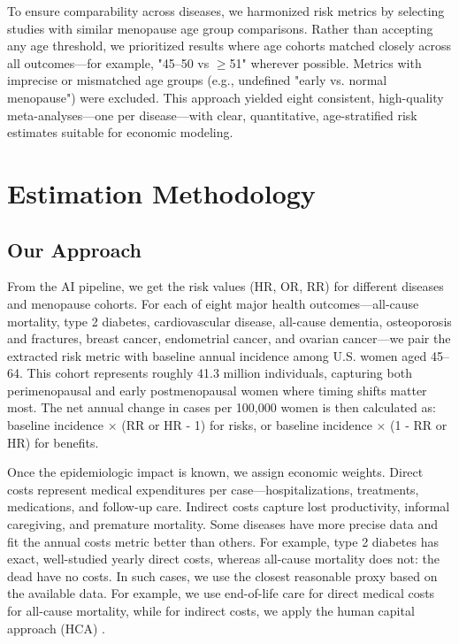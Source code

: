 \documentclass[12pt]{article}
\begin{document}
To ensure comparability across diseases, we harmonized risk metrics by selecting studies with similar menopause age group comparisons. Rather than accepting any age threshold, we prioritized results where age cohorts matched closely across all outcomes—for example, "45–50 vs $\geq$51" wherever possible. Metrics with imprecise or mismatched age groups (e.g., undefined "early vs. normal menopause") were excluded. This approach yielded eight consistent, high-quality meta-analyses—one per disease—with clear, quantitative, age-stratified risk estimates suitable for economic modeling.

\newpage
\section{Estimation Methodology}
\subsection{Our Approach}
From the AI pipeline, we get the risk values (HR, OR, RR) for different diseases and menopause cohorts. For each of eight major health outcomes---all-cause mortality, type 2 diabetes, cardiovascular disease, all-cause dementia, osteoporosis and fractures, breast cancer, endometrial cancer, and ovarian cancer---we pair the extracted risk metric with baseline annual incidence among U.S. women aged 45--64. This cohort represents roughly 41.3 million individuals, capturing both perimenopausal and early postmenopausal women where timing shifts matter most. The net annual change in cases per 100,000 women is then calculated as: baseline incidence $\times$ (RR or HR - 1) for risks, or baseline incidence $\times$ (1 - RR or HR) for benefits.

Once the epidemiologic impact is known, we assign economic weights. Direct costs represent medical expenditures per case---hospitalizations, treatments, medications, and follow-up care. Indirect costs capture lost productivity, informal caregiving, and premature mortality. Some diseases have more precise data and fit the annual costs metric better than others. For example, type 2 diabetes has exact, well-studied yearly direct costs, whereas all-cause mortality does not: the dead have no costs. In such cases, we use the closest reasonable proxy based on the available data. For example, we use end-of-life care for direct medical costs for all-cause mortality, while for indirect costs, we apply the human capital approach (HCA) \parencite{GROSSMAN2000}.
\end{document}
